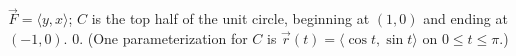{$\vec F = \langle y,x\rangle$; $C$ is the top half of the unit circle, beginning at $(1,0)$ and ending at $(-1,0)$.
}
{$0$. (One parameterization for $C$ is $\vec r(t) = \langle \cos t,\sin t\rangle$ on $0\leq t\leq \pi$.)
}
